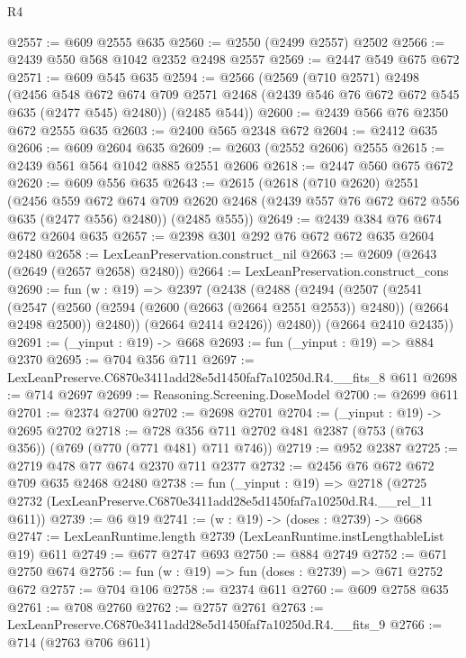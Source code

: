 \begin{lexlean}{R4}
\begin{coremodule}
@2557 := @609 @2555 @635
@2560 := @2550 (@2499 @2557) @2502
@2566 := @2439 @550 @568 @1042 @2352 @2498 @2557
@2569 := @2447 @549 @675 @672
@2571 := @609 @545 @635
@2594 := @2566
    (@2569
      (@710 @2571)
      @2498
      (@2456
        @548
        @672
        @674
        @709
        @2571
        @2468
        (@2439 @546 @76 @672 @672 @545 @635 (@2477 @545) @2480))
      (@2485 @544))
@2600 := @2439 @566 @76 @2350 @672 @2555 @635
@2603 := @2400 @565 @2348 @672
@2604 := @2412 @635
@2606 := @609 @2604 @635
@2609 := @2603 (@2552 @2606) @2555
@2615 := @2439 @561 @564 @1042 @885 @2551 @2606
@2618 := @2447 @560 @675 @672
@2620 := @609 @556 @635
@2643 := @2615
    (@2618
      (@710 @2620)
      @2551
      (@2456
        @559
        @672
        @674
        @709
        @2620
        @2468
        (@2439 @557 @76 @672 @672 @556 @635 (@2477 @556) @2480))
      (@2485 @555))
@2649 := @2439 @384 @76 @674 @672 @2604 @635
@2657 := @2398 @301 @292 @76 @672 @672 @635 @2604 @2480
@2658 := LexLeanPreservation.construct_nil
@2663 := @2609 (@2643 (@2649 (@2657 @2658) @2480))
@2664 := LexLeanPreservation.construct_cons
@2690 := fun (w : @19) =>
  @2397
    (@2438
      (@2488
        (@2494
          (@2507
            (@2541
              (@2547
                (@2560 (@2594 (@2600 (@2663 (@2664 @2551 @2553)) @2480)) (@2664 @2498 @2500))
                @2480))
            (@2664 @2414 @2426))
          @2480))
      (@2664 @2410 @2435))
@2691 := (_yinput : @19) -> @668
@2693 := fun (_yinput : @19) => @884 @2370
@2695 := @704 @356 @711
@2697 := LexLeanPreserve.C6870e3411add28e5d1450faf7a10250d.R4.__fits_8 @611
@2698 := @714 @2697
@2699 := Reasoning.Screening.DoseModel
@2700 := @2699 @611
@2701 := @2374 @2700
@2702 := @2698 @2701
@2704 := (_yinput : @19) -> @2695 @2702
@2718 := @728 @356 @711 @2702 @481 @2387 (@753 (@763 @356)) (@769 (@770 (@771 @481) @711 @746))
@2719 := @952 @2387
@2725 := @2719 @478 @77 @674 @2370 @711 @2377
@2732 := @2456 @76 @672 @672 @709 @635 @2468 @2480
@2738 := fun (_yinput : @19) =>
  @2718 (@2725 @2732 (LexLeanPreserve.C6870e3411add28e5d1450faf7a10250d.R4.__rel_11 @611))
@2739 := @6 @19
@2741 := (w : @19) -> (doses : @2739) -> @668
@2747 := LexLeanRuntime.length @2739 (LexLeanRuntime.instLengthableList @19) @611
@2749 := @677 @2747 @693
@2750 := @884 @2749
@2752 := @671 @2750 @674
@2756 := fun (w : @19) => fun (doses : @2739) => @671 @2752 @672
@2757 := @704 @106
@2758 := @2374 @611
@2760 := @609 @2758 @635
@2761 := @708 @2760
@2762 := @2757 @2761
@2763 := LexLeanPreserve.C6870e3411add28e5d1450faf7a10250d.R4.__fits_9
@2766 := @714 (@2763 @706 @611)

\end{coremodule}
\end{lexlean}
